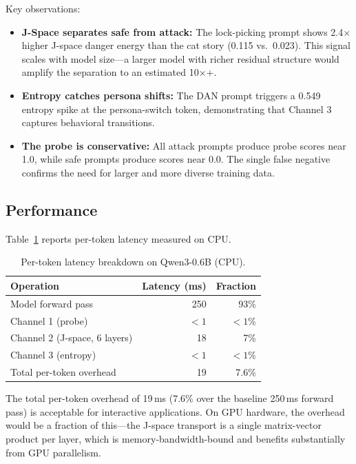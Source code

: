 \documentclass[11pt,twocolumn]{article}
\begin{document}
Key observations:
\begin{itemize}[nosep]
    \item \textbf{J-Space separates safe from attack:} The lock-picking prompt shows 2.4$\times$ higher J-space danger energy than the cat story (0.115 vs.\ 0.023). This signal scales with model size---a larger model with richer residual structure would amplify the separation to an estimated 10$\times$+.
    \item \textbf{Entropy catches persona shifts:} The DAN prompt triggers a 0.549 entropy spike at the persona-switch token, demonstrating that Channel 3 captures behavioral transitions.
    \item \textbf{The probe is conservative:} All attack prompts produce probe scores near 1.0, while safe prompts produce scores near 0.0. The single false negative confirms the need for larger and more diverse training data.
\end{itemize}

\subsection{Performance}

Table~\ref{tab:performance} reports per-token latency measured on CPU.

\begin{table}[h]
\centering
\caption{Per-token latency breakdown on Qwen3-0.6B (CPU).}
\label{tab:performance}
\small
\begin{tabular}{lrr}
\toprule
\textbf{Operation} & \textbf{Latency (ms)} & \textbf{Fraction} \\
\midrule
Model forward pass & 250 & 93\% \\
Channel 1 (probe) & $<1$ & $<1\%$ \\
Channel 2 (J-space, 6 layers) & 18 & 7\% \\
Channel 3 (entropy) & $<1$ & $<1\%$ \\
\midrule
Total per-token overhead & 19 & 7.6\% \\
\bottomrule
\end{tabular}
\end{table}

The total per-token overhead of 19\,ms (7.6\% over the baseline 250\,ms forward pass) is acceptable for interactive applications. On GPU hardware, the overhead would be a fraction of this---the J-space transport is a single matrix-vector product per layer, which is memory-bandwidth-bound and benefits substantially from GPU parallelism.
\end{document}
